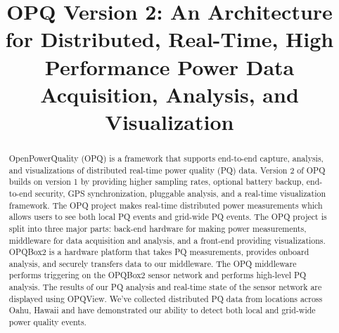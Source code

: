 \documentclass[a4paper, conference]{IEEEtran}
\begin{document}
%
\title{OPQ Version 2: An Architecture for Distributed, Real-Time, High Performance Power Data Acquisition, Analysis, and Visualization}


\author{
}


\maketitle

\begin{abstract}
OpenPowerQuality (OPQ) is a framework that supports end-to-end capture, analysis, and visualizations of distributed real-time power quality (PQ) data. Version 2 of OPQ builds on version 1 by providing higher sampling rates, optional battery backup, end-to-end security, GPS synchronization, pluggable analysis, and a real-time visualization framework. The OPQ project makes real-time distributed power measurements which allows users to see both local PQ events and grid-wide PQ events. The OPQ project is split into three major parts: back-end hardware for making power measurements, middleware for data acquisition and analysis, and a front-end providing visualizations. OPQBox2 is a hardware platform that takes PQ measurements, provides onboard analysis, and securely transfers data to our middleware. The OPQ middleware performs triggering on the OPQBox2 sensor network and performs high-level PQ analysis. The results of our PQ analysis and real-time state of the sensor network are displayed using OPQView. We've collected distributed PQ data from locations across Oahu, Hawaii and have demonstrated our ability to detect both local and grid-wide power quality events.
\end{abstract}
\IEEEpeerreviewmaketitle
\end{document}
